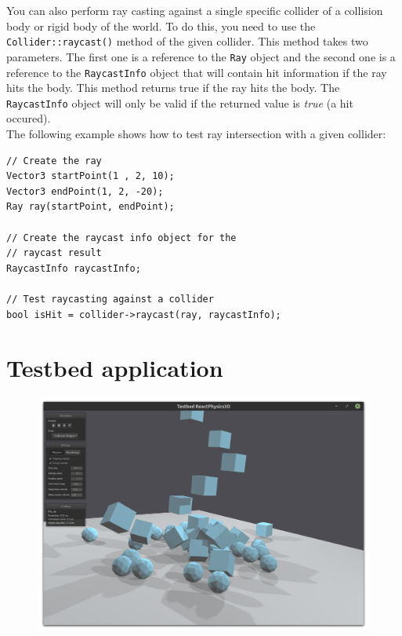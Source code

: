 \documentclass[a4paper,12pt]{article}
\begin{document}
    You can also perform ray casting against a single specific collider of a collision body or rigid body of the world. To do this, you need to use the
    \texttt{Collider::raycast()} method of the given collider. This method takes two parameters. The first one is a reference to the \texttt{Ray}
    object and the second one is a reference to the \texttt{RaycastInfo} object that will contain hit information if the ray hits the body. This method returns
    true if the ray hits the body. The \texttt{RaycastInfo} object will only be valid if the returned value is \emph{true} (a hit occured). \\

    The following example shows how to test ray intersection with a given collider: \\

    \begin{lstlisting}
// Create the ray
Vector3 startPoint(1 , 2, 10);
Vector3 endPoint(1, 2, -20);
Ray ray(startPoint, endPoint);

// Create the raycast info object for the
// raycast result
RaycastInfo raycastInfo;

// Test raycasting against a collider
bool isHit = collider->raycast(ray, raycastInfo);
    \end{lstlisting}

    \vspace{0.6cm}

    \section{Testbed application}
    \label{sec:testbed}

    \begin{figure}[!ht]
        \centering
	\includegraphics[scale=0.27]{testbed.png}
        \label{fig:testbed}
    \end{figure}
\end{document}
